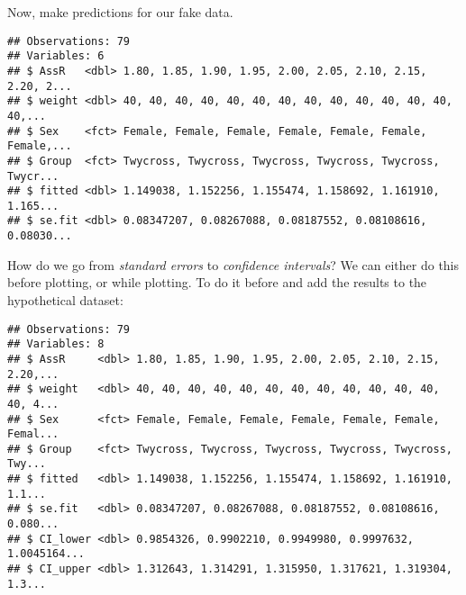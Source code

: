 \documentclass[]{book}
\newenvironment{Shaded}{\begin{snugshade}}{\end{snugshade}}
\newcommand{\DataTypeTok}[1]{\textcolor[rgb]{0.13,0.29,0.53}{#1}}
\newcommand{\FloatTok}[1]{\textcolor[rgb]{0.00,0.00,0.81}{#1}}
\newcommand{\KeywordTok}[1]{\textcolor[rgb]{0.13,0.29,0.53}{\textbf{#1}}}
\newcommand{\NormalTok}[1]{#1}
\newcommand{\OperatorTok}[1]{\textcolor[rgb]{0.81,0.36,0.00}{\textbf{#1}}}
\newcommand{\OtherTok}[1]{\textcolor[rgb]{0.56,0.35,0.01}{#1}}
\newcommand{\StringTok}[1]{\textcolor[rgb]{0.31,0.60,0.02}{#1}}
\begin{document}
Now, make predictions for our fake data.

\begin{Shaded}
\end{Shaded}

\begin{verbatim}
## Observations: 79
## Variables: 6
## $ AssR   <dbl> 1.80, 1.85, 1.90, 1.95, 2.00, 2.05, 2.10, 2.15, 2.20, 2...
## $ weight <dbl> 40, 40, 40, 40, 40, 40, 40, 40, 40, 40, 40, 40, 40, 40,...
## $ Sex    <fct> Female, Female, Female, Female, Female, Female, Female,...
## $ Group  <fct> Twycross, Twycross, Twycross, Twycross, Twycross, Twycr...
## $ fitted <dbl> 1.149038, 1.152256, 1.155474, 1.158692, 1.161910, 1.165...
## $ se.fit <dbl> 0.08347207, 0.08267088, 0.08187552, 0.08108616, 0.08030...
\end{verbatim}

How do we go from \emph{standard errors} to \emph{confidence intervals}? We can either do this before plotting, or while plotting. To do it before and add the results to the hypothetical dataset:

\begin{Shaded}
\end{Shaded}

\begin{verbatim}
## Observations: 79
## Variables: 8
## $ AssR     <dbl> 1.80, 1.85, 1.90, 1.95, 2.00, 2.05, 2.10, 2.15, 2.20,...
## $ weight   <dbl> 40, 40, 40, 40, 40, 40, 40, 40, 40, 40, 40, 40, 40, 4...
## $ Sex      <fct> Female, Female, Female, Female, Female, Female, Femal...
## $ Group    <fct> Twycross, Twycross, Twycross, Twycross, Twycross, Twy...
## $ fitted   <dbl> 1.149038, 1.152256, 1.155474, 1.158692, 1.161910, 1.1...
## $ se.fit   <dbl> 0.08347207, 0.08267088, 0.08187552, 0.08108616, 0.080...
## $ CI_lower <dbl> 0.9854326, 0.9902210, 0.9949980, 0.9997632, 1.0045164...
## $ CI_upper <dbl> 1.312643, 1.314291, 1.315950, 1.317621, 1.319304, 1.3...
\end{verbatim}
\end{document}
